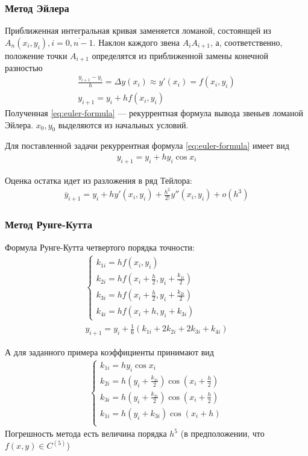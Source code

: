 \subsubsection{Метод Эйлера}
Приближенная интегральная кривая заменяется ломаной, состоянщей из \(A_n(x_i, y_i), i = \overline{0, n-1}\). Наклон каждого звена \(A_iA_{i+1}\), а, соответственно, положение точки \(A_{i+1}\) определятся из приближенной замены конечной разностью
\begin{align}
	\frac{y_{i+1} - y_i}{h} = \Delta y(x_i) \approx y'(x_i) = f(x_i, y_i) \\
	\label{eq:euler-formula}
	y_{i+1} = y_i + h f(x_i, y_i)
\end{align}
Полученная \cref{eq:euler-formula} --- рекуррентная формула вывода звеньев ломаной Эйлера. \(x_0, y_0\) выделяются из начальных условий.

Для поставленной задачи рекуррентная формула \cref{eq:euler-formula} имеет вид
\begin{align}
	y_{i+1} = y_i + h y_i \cos x_i
\end{align}

Оценка остатка идет из разложения в ряд Тейлора:
\begin{align}
	\overline{y}_{i+1} = y_i + h y'(x_i, y_i) + \frac{h^2}{2!} y''(x_i, y_i) + o(h^3)
\end{align}

\subsubsection{Метод Рунге-Кутта}
Формула Рунге-Кутта четвертого порядка точности:
\begin{align}
	\begin{cases}
		k_{1i} = hf(x_i, y_i)                                             \\
		k_{2i} = hf\left(x_i + \frac{h}{2}, y_i + \frac{k_{1i}}{2}\right) \\
		k_{3i} = hf\left(x_i + \frac{h}{2}, y_i + \frac{k_{2i}}{2}\right) \\
		k_{4i} = hf(x_i + h, y_i + k_{3i})
	\end{cases} \\
	y_{i+1} = y_i + \frac{1}{6}(k_{1i} + 2 k_{2i} + 2 k_{3i} + k_{4i})
\end{align}

А для заданного примера коэффициенты принимают вид
\begin{align}
	\begin{cases}
		k_{1i} = h y_i \cos x_i                                                            \\
		k_{2i} = h \left(y_i + \frac{k_{1i}}{2} \right)\cos\left(x_i + \frac{h}{2} \right) \\
		k_{3i} = h \left(y_i + \frac{k_{2i}}{2} \right)\cos\left(x_i + \frac{h}{2} \right) \\
		k_{1i} = h (y_i + k_{3i}) \cos (x_i + h)                                           \\
	\end{cases}
\end{align}
Погрешность метода есть величина порядка \(h^5\) (в предположении, что \(f(x,y) \in C^{(5)}\))

